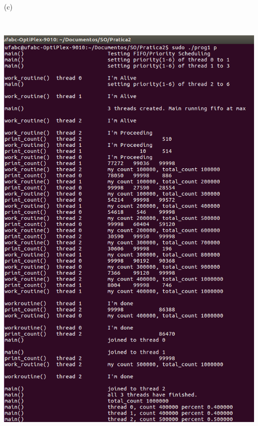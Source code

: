\begin{minipage}{\textwidth}
\begin{minipage}[b]{0.32\textwidth}
        (c)
    \end{minipage}
    \hspace{1em}
    \\
    \hspace{-1em}
    \begin{minipage}[b]{0.32\textwidth}
        \centering
        \includegraphics[trim=0 0 0 0,clip,scale=.25]{pratica2/prog1-p.png}
        

\end{minipage}
\end{minipage}
